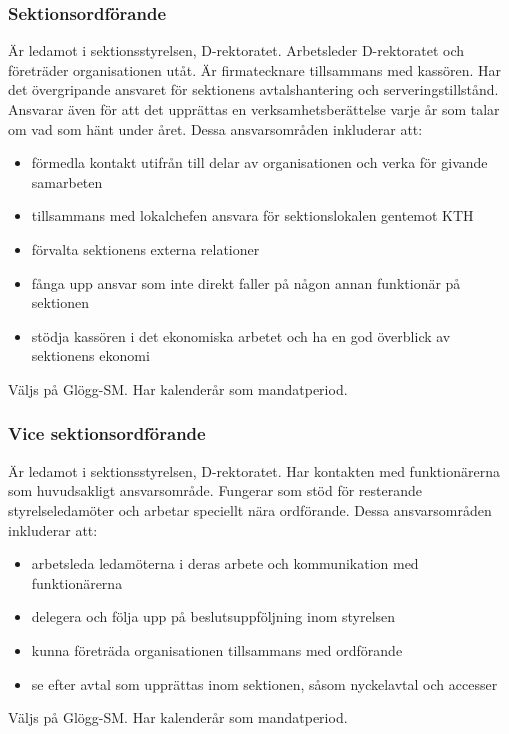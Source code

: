 \documentclass{dgovdoc}
\begin{document}
\subsubsection{Sektionsordförande}

Är ledamot i sektionsstyrelsen, D-rektoratet. Arbetsleder D-rektoratet och företräder
organisationen utåt. Är firmatecknare tillsammans med kassören. Har det övergripande
ansvaret för sektionens avtalshantering och serveringstillstånd. Ansvarar även för att
det upprättas en verksamhetsberättelse varje år som talar om vad som hänt under året.
Dessa ansvarsområden inkluderar att:
\begin{itemize}
	\item förmedla kontakt utifrån till delar av organisationen och verka för givande samarbeten
	\item tillsammans med lokalchefen ansvara för sektionslokalen gentemot KTH
	\item förvalta sektionens externa relationer
	\item fånga upp ansvar som inte direkt faller på någon annan funktionär på sektionen
	\item stödja kassören i det ekonomiska arbetet och ha en god överblick av sektionens ekonomi
\end{itemize}

Väljs på Glögg-SM. Har kalenderår som mandatperiod.

\subsubsection{Vice sektionsordförande}

Är ledamot i sektionsstyrelsen, D-rektoratet. Har kontakten med funktionärerna som
huvudsakligt ansvarsområde. Fungerar som stöd för resterande styrelseledamöter och
arbetar speciellt nära ordförande. Dessa ansvarsområden inkluderar att:
\begin{itemize}
	\item arbetsleda ledamöterna i deras arbete och kommunikation med funktionärerna
	\item delegera och följa upp på beslutsuppföljning inom styrelsen
	\item kunna företräda organisationen tillsammans med ordförande
	\item se efter avtal som upprättas inom sektionen, såsom nyckelavtal och accesser
\end{itemize}

Väljs på Glögg-SM. Har kalenderår som mandatperiod.
\end{document}
